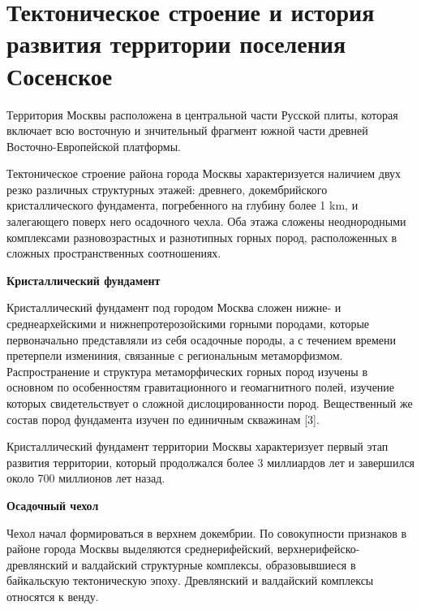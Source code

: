 \chapter*{Тектоническое строение и история развития территории поселения Сосенское}

Территория Москвы расположена  в центральной части
Русской плиты, которая включает всю восточную и знчительный фрагмент южной части древней
Восточно-Европейской платформы. 

Тектоническое строение района города Москвы характеризуется наличием двух резко различных
структурных этажей: древнего, докембрийского кристаллического фундамента, погребенного 
на глубину более 1 \si{\kilo\meter}, и залегающего поверх него осадочного чехла.
Оба этажа сложены неоднородными комплексами разновозрастных и разнотипных горных пород, 
расположенных в сложных пространственных соотношениях.

\textbf{Кристаллический фундамент}

Кристаллический фундамент под городом Москва сложен нижне- и среднеархейскими и 
нижнепротерозойскими горными породами, которые первоначально представляли из себя 
осадочные породы, а с течением времени претерпели измениния, связанные с региональным 
метаморфизмом. Распространение и структура метаморфических горных пород изучены в 
основном по особенностям гравитационного и геомагнитного полей, изучение которых свидетельствует 
о сложной дислоцированности пород. Вещественный же состав пород фундамента изучен по 
единичным скважинам [3]. 

Кристаллический фундамент территории Москвы характеризует первый этап развития территории,
который продолжался более 3 миллиардов лет и завершился около 700 миллионов лет назад.

\textbf{Осадочный чехол}

Чехол начал формироваться в верхнем докембрии. По совокупности 
признаков в районе города Москвы выделяются среднерифейский, верхнерифейско-древлянский 
и валдайский структурные комплексы, образовывшиеся в байкальскую тектоническую эпоху. 
Древлянский и валдайский комплексы относятся к венду.

